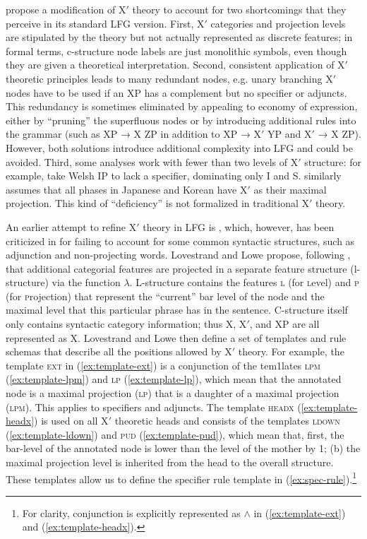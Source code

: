 \documentclass[output=paper,hidelinks]{langscibook}
\begin{document}
 \textcite{lovestrand-lowe2017} propose a modification of X$'$ theory to account for two shortcomings that they perceive in its standard LFG version. First, X$'$ categories and projection levels are stipulated by the theory but not actually represented as discrete features; in formal terms, c-structure node labels are just monolithic symbols, even though they are given a theoretical interpretation. Second, consistent application of X$'$ theoretic principles leads to many redundant nodes, e.g. unary branching X$'$ nodes have to be used if an XP has a complement but no specifier or adjuncts. This redundancy is sometimes eliminated by appealing to economy of expression, either by ``pruning'' the superfluous nodes \parencite{BresnanEtAl2016} or by introducing additional rules into the grammar (such as XP → X ZP in addition to XP → X$'$ YP and X$'$ → X ZP).  However, both solutions introduce additional complexity into LFG and could be avoided. Third, some analyses work with fewer than two levels of X$'$ structure: for example, \textcite[130]{BresnanEtAl2016} take Welsh IP to lack a specifier, dominating only I and S. \textcite{sells1994,sells1995} similarly assumes that all phases in Japanese and Korean have X$'$ as their maximal projection. This kind of ``deficiency'' is not formalized in traditional X$'$ theory.
 
 An earlier attempt to refine X$'$ theory in LFG is \textcite{marcotte2014}, which, however, has been criticized in \textcite{lovestrand-lowe2017} for failing to account for some common syntactic structures, such as adjunction and non-projecting words. Lovestrand and Lowe propose, following \textcite{kapl:89}, that additional categorial features are projected in a separate feature structure (l-structure) via the function $\lambda$. L-structure contains the features \textsc{l} (for \textsc{l}evel) and \textsc{p} (for \textsc{p}rojection) that represent the ``current'' bar level of the node and the maximal level that this particular phrase has in the sentence. C-structure itself only contains syntactic category information; thus X, X$'$, and XP are all represented as X. Lovestrand and Lowe then define a set of templates and rule schemas that describe all the positions allowed by X$'$ theory. For example, the template \textsc{ext} in (\ref{ex:template-ext}) is a conjunction of the tem1lates \textsc{lpm} (\ref{ex:template-lpm}) and \textsc{lp} (\ref{ex:template-lp}), which mean that the annotated node is a maximal projection (\textsc{lp}) that is a daughter of a maximal projection (\textsc{lpm}). This applies to specifiers and adjuncts. The template \textsc{headx} (\ref{ex:template-headx}) is used on all X$'$ theoretic heads and consists of the templates \textsc{ldown} (\ref{ex:template-ldown}) and \textsc{pud} (\ref{ex:template-pud}), which mean that, first, the bar-level of the annotated node is lower than the level of the mother by 1; (b) the maximal projection level is inherited from the head to the overall structure. These templates allow us to define the specifier rule template in (\ref{ex:spec-rule}).\footnote{For clarity, conjunction is explicitly represented as $\wedge$ in (\ref{ex:template-ext}) and (\ref{ex:template-headx}).}
 
\end{document}
